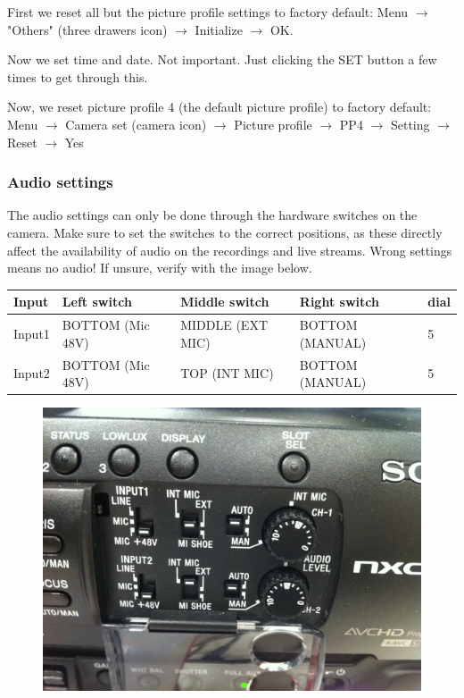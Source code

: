 \documentclass{article}
\begin{document}
First we reset all but the picture profile settings to factory default:
Menu $\rightarrow$ "Others" (three drawers icon) $\rightarrow$ Initialize $\rightarrow$ OK.

Now we set time and date. Not important. Just clicking the SET button a few times to get through this.

Now, we reset picture profile 4 (the default picture profile) to factory default:
Menu $\rightarrow$ Camera set (camera icon) $\rightarrow$ Picture profile $\rightarrow$ PP4 $\rightarrow$ Setting $\rightarrow$ Reset $\rightarrow$ Yes

\subsubsection{Audio settings}
The audio settings can only be done through the hardware switches on the camera.
Make sure to set the switches to the correct positions, as these directly affect the availability of audio on the recordings and live streams. Wrong settings means no audio!
If unsure, verify with the image below.

\begin{tabular}{| l || l | l | l | l |}
Input & Left switch & Middle switch & Right switch & dial \\ \hline
Input1 & BOTTOM (Mic 48V) & MIDDLE (EXT MIC) & BOTTOM (MANUAL) & 5 \\
Input2 & BOTTOM (Mic 48V) & TOP (INT MIC) & BOTTOM (MANUAL) & 5 \\
\end{tabular}

\begin{figure}[H]
  \centering
\includegraphics[width = 120mm]{sony_audio_settings.jpg}
\end{figure}
\end{document}
